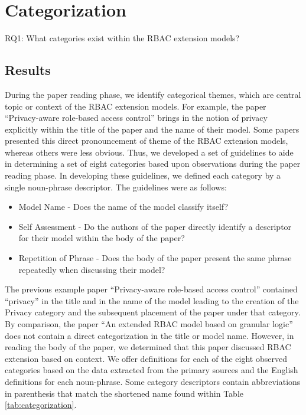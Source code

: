 
\section{Categorization} \label{sec:categorization}

RQ1: What categories exist within the RBAC extension models?

\subsection{Results}


During the paper reading phase, we identify categorical themes, which are
central topic or context of the RBAC extension models. 
For example, the paper ``Privacy-aware role-based access control'' \cite{ni2010privacy} brings in the notion of privacy explicitly within the title of the paper and the name of their model. 
Some papers presented this direct pronouncement of theme of the RBAC extension models, whereas others were less obvious. 
Thus, we developed a set of guidelines to aide in determining a set of eight categories based upon observations during the paper reading phase. 
In developing these guidelines, we defined each category by a single noun-phrase descriptor.
The guidelines were as follows:

\begin{itemize}
\item Model Name - Does the name of the model classify itself?
\item Self Assessment - Do the authors of the paper directly identify a descriptor for their model within the body of the paper?
\item Repetition of Phrase - Does the body of the paper present the same phrase repeatedly when discussing their model?
\end{itemize}

The previous example paper ``Privacy-aware role-based access control'' \cite{ni2010privacy} contained ``privacy'' in
the title and in the name of the model leading to the creation of the Privacy category and the subsequent placement of the paper under that category.
By comparison, the paper ``An extended RBAC model based on granular logic'' \cite{jian2008extended} does not contain a direct categorization in the title or model name. However, in reading the body of the paper, we determined that this paper discussed RBAC extension based on context. 
We offer definitions for each of the eight observed categories based on the data extracted from the primary sources and the English definitions for each noun-phrase. 
Some category descriptors contain abbreviations in parenthesis that match the shortened name found within Table \ref{tab:categorization}.

